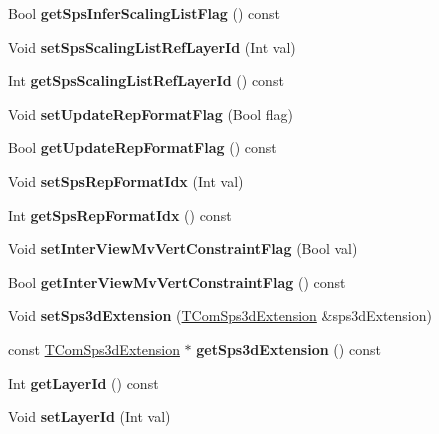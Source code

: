 \begin{DoxyCompactItemize}
Bool {\bfseries get\+Sps\+Infer\+Scaling\+List\+Flag} () const
\item 
\mbox{\label{class_t_com_s_p_s_aa148ab3a4f6af778df6e63110a9eaafc}} 
Void {\bfseries set\+Sps\+Scaling\+List\+Ref\+Layer\+Id} (Int val)
\item 
\mbox{\label{class_t_com_s_p_s_a3b2e478c3c302723f5c5651ace9e7fd8}} 
Int {\bfseries get\+Sps\+Scaling\+List\+Ref\+Layer\+Id} () const
\item 
\mbox{\label{class_t_com_s_p_s_a449550cbe1aa8bebb0a1d916de7a54b0}} 
Void {\bfseries set\+Update\+Rep\+Format\+Flag} (Bool flag)
\item 
\mbox{\label{class_t_com_s_p_s_affed6d5cc410c4fcfcc638944657ec81}} 
Bool {\bfseries get\+Update\+Rep\+Format\+Flag} () const
\item 
\mbox{\label{class_t_com_s_p_s_aaea8406771ffdf47724bc1a5611effda}} 
Void {\bfseries set\+Sps\+Rep\+Format\+Idx} (Int val)
\item 
\mbox{\label{class_t_com_s_p_s_a7ec11760731ae07b87fe9ceb3f216dc0}} 
Int {\bfseries get\+Sps\+Rep\+Format\+Idx} () const
\item 
\mbox{\label{class_t_com_s_p_s_a1beee8697cf1a3d94744a64cf2d44628}} 
Void {\bfseries set\+Inter\+View\+Mv\+Vert\+Constraint\+Flag} (Bool val)
\item 
\mbox{\label{class_t_com_s_p_s_a11d7b9029370385e65ceb76a079b39bd}} 
Bool {\bfseries get\+Inter\+View\+Mv\+Vert\+Constraint\+Flag} () const
\item 
\mbox{\label{class_t_com_s_p_s_ac41a8ad1b7b443b1d44beab1f60afafb}} 
Void {\bfseries set\+Sps3d\+Extension} (\hyperlink{class_t_com_sps3d_extension}{T\+Com\+Sps3d\+Extension} \&sps3d\+Extension)
\item 
\mbox{\label{class_t_com_s_p_s_a2a2919d5bf7aae68d2d73f5eabf7de0b}} 
const \hyperlink{class_t_com_sps3d_extension}{T\+Com\+Sps3d\+Extension} $\ast$ {\bfseries get\+Sps3d\+Extension} () const
\item 
\mbox{\label{class_t_com_s_p_s_aa5eb4aca2e8411c3126bfb3f55ff4065}} 
Int {\bfseries get\+Layer\+Id} () const
\item 
\mbox{\label{class_t_com_s_p_s_a99fd040b5c5370c72e2c1cb7dc4cc780}} 
Void {\bfseries set\+Layer\+Id} (Int val)
\end{DoxyCompactItemize}
